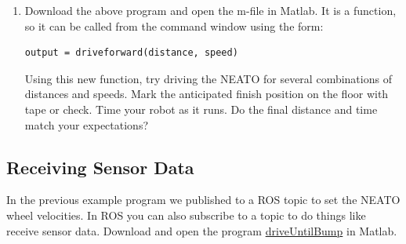 \documentclass[M3_Night2_Solutions]{subfiles}
\begin{document}
%
%
%
%
%
%
%
%        
%
%


\begin{enumerate}[resume=exercises, label=\textbf{Exercise} (\arabic*)]
\item Download the above program and open the m-file in Matlab. It is a function, so it can be called from the command window using the form:
\begin{verbatim}
output = driveforward(distance, speed)
\end{verbatim}

Using this new function, try driving the NEATO for several combinations of distances and speeds. Mark the anticipated finish position on the floor with tape or check. Time your robot as it runs. Do the final distance and time match your expectations?
\end{enumerate}

\subsection{Receiving Sensor Data}

In the previous example program we published to a ROS topic to set the NEATO wheel velocities. In ROS you can also subscribe to a topic to do things like receive sensor data. Download and open the program \href{https://drive.google.com/file/d/1DfVy8Nvc7KsOMiJcjBcAhPF8cUOe7-uv/view?usp=sharing}{driveUntilBump} in Matlab.
\end{document}
